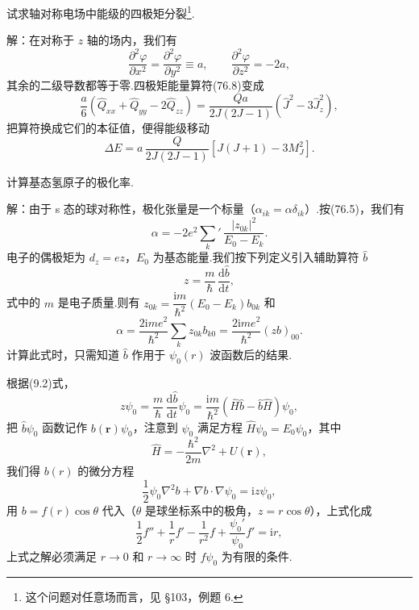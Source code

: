\begin{xiti}
\quad 试求轴对称电场中能级的四极矩分裂\footnote{这个问题对任意场而言，见 §103，例题 6.}.

解：在对称于 $z$ 轴的场内，我们有
\begin{equation*}
  \frac{\partial^{2}\varphi}{\partial x^{2}}=\frac{\partial^{2}\varphi}{\partial y^{2}}\equiv a,
  \qquad
  \frac{\partial^{2}\varphi}{\partial z^{2}}=-2a,
\end{equation*}
其余的二级导数都等于零.四极矩能量算符(76.8)变成
\begin{equation*}
  \frac{a}{6}\left(\hat{Q}_{xx}+\hat{Q}_{yy}-2\hat{Q}_{zz}\right)
  =\frac{Qa}{2J(2J-1)}\left(\hat{J}^{2}-3\hat{J}_z^{2}\right),
\end{equation*}
把算符换成它们的本征值，便得能级移动
\begin{equation*}
  \Delta E=a\,\frac{Q}{2J(2J-1)}\left[J(J+1)-3M_J^{2}\right].
\end{equation*}

\quad 计算基态氢原子的极化率.

解：由于 s 态的球对称性，极化张量是一个标量（$\alpha_{ik}=\alpha\delta_{ik}$）.按(76.5)，我们有
\begin{equation*}
  \alpha=-2e^{2}{\sum_k}'\,\frac{|z_{0k}|^{2}}{E_0-E_k}.
\end{equation*}
电子的偶极矩为 $d_z=ez$，$E_0$ 为基态能量.我们按下列定义引入辅助算符 $\hat{b}$
\begin{equation*}
  z=\frac{m}{\hbar}\,\frac{\mathrm{d}\hat{b}}{\mathrm{d}t},
\end{equation*}
式中的 $m$ 是电子质量.则有 $z_{0k}=\dfrac{\mathrm{i}m}{\hbar^{2}}(E_0-E_k)b_{0k}$ 和
\setcounter{equation}{0}\renewcommand{\theequation}{\arabic{equation}}%
\begin{equation}
  \alpha=\frac{2\mathrm{i}me^{2}}{\hbar^{2}}\sum_k z_{0k}b_{k0}
  =\frac{2\mathrm{i}me^{2}}{\hbar^{2}}(zb)_{00}.
\end{equation}
计算此式时，只需知道 $\hat{b}$ 作用于 $\psi_0(r)$ 波函数后的结果.

根据(9.2)式，
\begin{equation*}
  z\psi_0=\frac{m}{\hbar}\,\frac{\mathrm{d}\hat{b}}{\mathrm{d}t}\psi_0
  =\frac{\mathrm{i}m}{\hbar^{2}}\left(\hat{H}\hat{b}-\hat{b}\hat{H}\right)\psi_0,
\end{equation*}
把 $\hat{b}\psi_0$ 函数记作 $b(\boldsymbol{r})\psi_0$，注意到 $\psi_0$ 满足方程 $\hat{H}\psi_0=E_0\psi_0$，其中
\begin{equation*}
  \hat{H}=-\frac{\hbar^{2}}{2m}\nabla^{2}+U(\boldsymbol{r}),
\end{equation*}
我们得 $b(r)$ 的微分方程
\begin{equation*}
  \frac{1}{2}\psi_0\nabla^{2}b+\nabla b\cdot\nabla\psi_0=\mathrm{i}z\psi_0,
\end{equation*}
用 $b=f(r)\cos\theta$ 代入（$\theta$ 是球坐标系中的极角，$z=r\cos\theta$），上式化成
\begin{equation}
  \frac{1}{2}f''+\frac{1}{r}f'-\frac{1}{r^{2}}f+\frac{\psi_0'}{\psi_0}f'=\mathrm{i}r,
\end{equation}
上式之解必须满足 $r\rightarrow0$ 和 $r\rightarrow\infty$ 时 $f\psi_0$ 为有限的条件.


\end{xiti}
